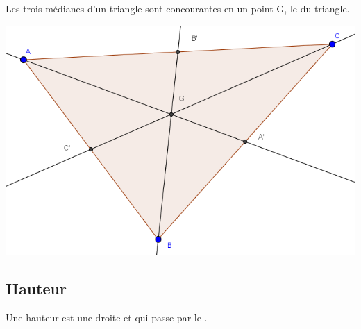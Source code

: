 \documentclass[12pt,a4paper]{article}
\begin{document}
\begin{myprop}
	
	\begin{multicols}{2}
		
		Les trois médianes d'un triangle sont concourantes en un point G, le  du triangle. 
		
		\begin{center}
			\includegraphics[scale=0.35]{./img/medianes}
		\end{center} 
	\end{multicols}
\end{myprop}

\subsection{Hauteur}

\begin{mydef}	
	Une hauteur est une droite  et qui passe par le .
\end{mydef}
\end{document}
